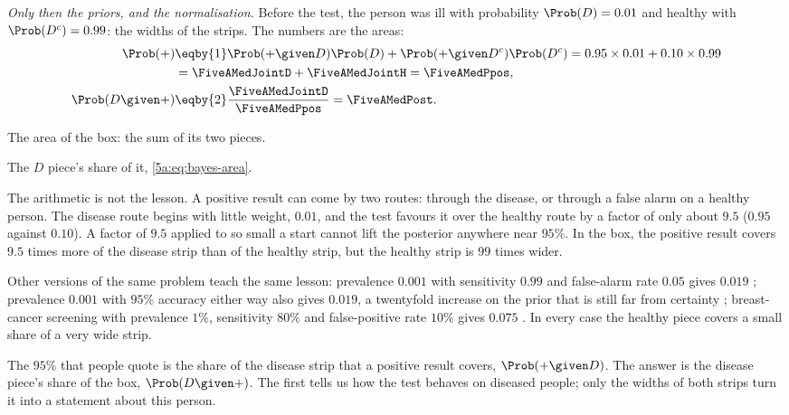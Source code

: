 \emph{Only then the priors, and the normalisation.} Before the test, the person
was ill with probability $\Prob(D)=0.01$ and healthy with $\Prob(D^c)=0.99$: the
widths of the strips. The numbers are the areas:
\begin{align*}
  \Prob(+)
  &\eqby{1}\Prob(+\given D)\Prob(D)+\Prob(+\given D^c)\Prob(D^c)
   =0.95\times0.01+0.10\times0.99\\
  &=\FiveAMedJointD+\FiveAMedJointH=\FiveAMedPpos,\\
  \Prob(D\given +)
  &\eqby{2}\frac{\FiveAMedJointD}{\FiveAMedPpos}=\FiveAMedPost .
\end{align*}
\begin{explain}
  \item The area of the box: the sum of its two pieces.
  \item The $D$ piece's share of it, \eqref{5a:eq:bayes-area}.
\end{explain}
The arithmetic is not the lesson. A positive result can come by two routes:
through the disease, or through a false alarm on a healthy person. The disease
route begins with little weight, $0.01$, and the test favours it over the healthy
route by a factor of only about $9.5$ ($0.95$ against $0.10$). A factor of $9.5$
applied to so small a start cannot lift the posterior anywhere near $95\%$.
In the box, the positive result covers $9.5$ times more of the disease strip than
of the healthy strip, but the healthy strip is $99$ times wider.

Other versions of the same problem teach the same lesson: prevalence $0.001$ with
sensitivity $0.99$ and false-alarm rate $0.05$ gives $0.019$
; prevalence $0.001$ with $95\%$ accuracy
either way also gives $0.019$, a twentyfold increase on the prior that is still
far from certainty ; breast-cancer screening with
prevalence $1\%$, sensitivity $80\%$ and false-positive rate $10\%$ gives $0.075$
. In every case the healthy piece covers a small share of a very wide strip.

\begin{pitfall}
The $95\%$ that people quote is the share of the disease strip that a positive
result covers, $\Prob(+\given D)$. The answer is the disease piece's share of the
box, $\Prob(D\given +)$. The first tells us how the test behaves on diseased
people; only the widths of both strips turn it into a statement about this
person.
\end{pitfall}

